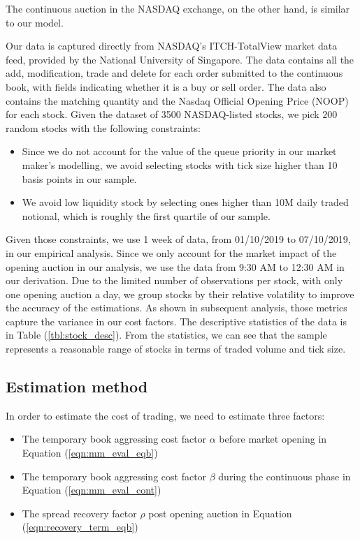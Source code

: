 The continuous auction in the NASDAQ exchange, on the other hand, is similar to our model.

Our data is captured directly from NASDAQ's ITCH-TotalView market data feed, provided by the National University of Singapore. The data contains all the add, modification, trade and delete for each order submitted to the continuous book, with fields indicating whether it is a buy or sell order. The data also contains the matching quantity and the Nasdaq Official Opening Price (NOOP) for each stock. Given the dataset of 3500 NASDAQ-listed stocks, we pick $200$ random stocks with the following constraints:
\begin{itemize}
  \item Since we do not account for the value of the queue priority in our market maker's modelling, we avoid selecting stocks with tick size higher than 10 basis points in our sample.
  \item We avoid low liquidity stock by selecting ones higher than 10M daily traded notional, which is roughly the first quartile of our sample.
\end{itemize}

Given those constraints, we use 1 week of data, from 01/10/2019 to 07/10/2019, in our empirical analysis. Since we only account for the market impact of the opening auction in our analysis, we use the data from 9:30 AM to 12:30 AM in our derivation. Due to the limited number of observations per stock, with only one opening auction a day, we group stocks by their relative volatility to improve the accuracy of the estimations. As shown in subsequent analysis, those metrics capture the variance in our cost factors. The descriptive statistics of the data is in Table (\ref{tbl:stock_desc}). From the statistics, we can see that the sample represents a reasonable range of stocks in terms of traded volume and tick size.



\subsection{Estimation method}
In order to estimate the cost of trading, we need to estimate three factors:

\begin{itemize}
  \item The temporary book aggressing cost factor $\alpha$ before market opening in Equation (\ref{eqn:mm_eval_eqb})
  \item The temporary book aggressing cost factor $\beta$ during the continuous phase in Equation (\ref{eqn:mm_eval_cont})
  \item The spread recovery factor $\rho$ post opening auction in Equation (\ref{eqn:recovery_term_eqb})
\end{itemize}

